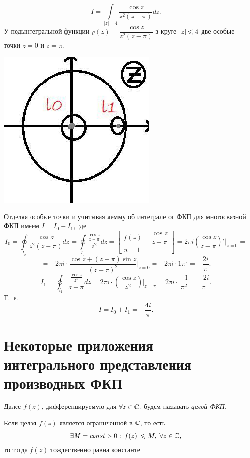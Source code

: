 \documentclass[../../main.tex]{subfiles}
\begin{document}
\begin{exmp}
	\[
	I = \int\limits_{|z|=4}\frac{\cos z}{z^2 (z-\pi)}
	dz.
	\]
	У подынтегральной функции $g(z)=\dfrac{\cos z}
	{z^2(z-\pi)}$ в круге $\left|{z}\right| \leqslant 4$
	две особые точки $z=0$ и $z=\pi$.
	
	\begin{center}
	\includegraphics{lec33_1}
	\end{center}
	
	Отделяя особые точки и учитывая лемму об 
	интеграле от ФКП для многосвязной ФКП имеем 
	$I = I_0 + I_1$, где 
	\[
	I_0 = 
	\oint\limits_{l_0}\dfrac{\cos z}{z^2(z - \pi)} 
	dz=
	\oint\limits_{l_0}\dfrac{\frac{\cos z}
		{z-\pi}}{z^2} dz
	= \left[
	\begin{array}{l}
	f(z) = \dfrac{\cos z}{z-\pi} \\
	n = 1
	\end{array}
	\right] = 
	2\pi i \left( \dfrac{\cos z}{z-\pi}\right)'
	\bigg|_{z=0}=
	\]
	\[= -2\pi i \cdot \dfrac{\cos z + 
		(z - \pi) \sin z}{(z-\pi)^2}\bigg|_{z=0}=
	-2\pi i \cdot {1}{\pi ^2} = -\dfrac{2i}{\pi}.
	\]
	\[
	I_1 = \oint_{l_1} \dfrac{\frac{\cos z}{z^2}}
	{z-\pi} dz = 2 \pi i \cdot \left(
	\dfrac{\cos z}{z^2}
	\right) |_{z=\pi} = 2\pi i \cdot \dfrac{-1}{\pi^2}
	=\dfrac{-2i}{\pi}.
	\]
	Т.~е.
	\[
	I = I_0 + I_1 = -\dfrac{4i}{\pi}.
	\]
\end{exmp}

\section{Некоторые приложения интегрального
	представления производных ФКП}

Далее $f(z)$, дифференцируемую для $\forall z \in \mathbb{C}$,
будем называть \emph{целой ФКП}.
\begin{thm}[Лиувилль]
	Если целая $f(z)$ является ограниченной в $\mathbb{C}$,
	то есть
	\begin{equation}
	\label{lec33:11}
	\exists M = const > 0 : \left|{f(z)}\right|
	\leqslant M,\ \forall z \in \mathbb{C}, 
	\end{equation}
	то тогда $f(z)$ тождественно равна константе.
\end{thm}
	
\end{document}
